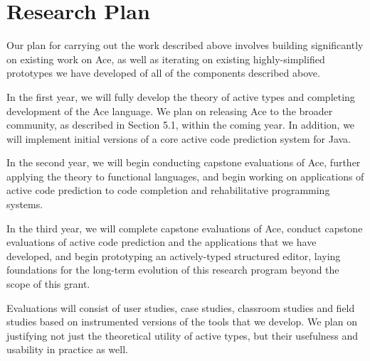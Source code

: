 \section{Research Plan}

Our plan for carrying out the work described above involves building significantly on existing work on Ace, as well as iterating on existing highly-simplified prototypes we have developed of all of the components described above.

In the first year, we will fully develop the theory of active types and completing development of the Ace language. We plan on releasing Ace to the broader community, as described in Section 5.1, within the coming year. In addition, we will implement initial versions of a core active code prediction system for Java.

In the second year, we will begin conducting capstone evaluations of Ace, further applying the theory to functional languages, and begin working on applications of active code prediction to code completion and rehabilitative programming systems. 

In the third year, we will complete capstone evaluations of Ace, conduct capstone evaluations of active code prediction and the applications that we have developed, and begin prototyping an actively-typed structured editor, laying foundations for the long-term evolution of this research program beyond the scope of this grant.

Evaluations will consist of user studies, case studies, classroom studies and field studies based on instrumented versions of the tools that we develop. We plan on justifying not just the theoretical utility of active types, but their usefulness and usability in practice as well.